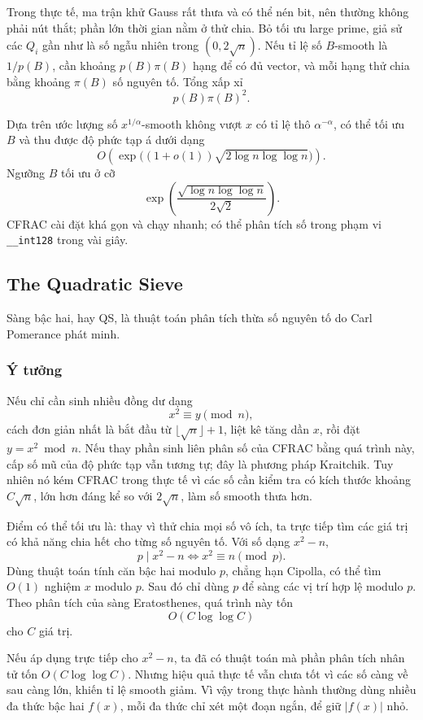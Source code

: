 \documentclass[11pt]{article}
\begin{document}
Trong thực tế, ma trận khử Gauss rất thưa và có thể nén bit, nên thường không
phải nút thắt; phần lớn thời gian nằm ở thử chia. Bỏ tối ưu large prime, giả
sử các \(Q_i\) gần như là số ngẫu nhiên trong \((0,2\sqrt n)\). Nếu tỉ lệ số
\(B\)-smooth là \(1/p(B)\), cần khoảng \(p(B)\pi(B)\) hạng để có đủ vector, và
mỗi hạng thử chia bằng khoảng \(\pi(B)\) số nguyên tố. Tổng xấp xỉ
\[
  p(B)\pi(B)^2.
\]

Dựa trên ước lượng số \(x^{1/\alpha}\)-smooth không vượt \(x\) có tỉ lệ thô
\(\alpha^{-\alpha}\), có thể tối ưu \(B\) và thu được độ phức tạp á dưới dạng
\[
  O\left(\exp\bigl((1+o(1))\sqrt{2\log n\log\log n}\bigr)\right).
\]
Ngưỡng \(B\) tối ưu ở cỡ
\[
  \exp\left(\frac{\sqrt{\log n\log\log n}}{2\sqrt2}\right).
\]
CFRAC cài đặt khá gọn và chạy nhanh; có thể phân tích số trong phạm vi
\texttt{\_\_int128} trong vài giây.

\subsection{The Quadratic Sieve}

Sàng bậc hai, hay QS, là thuật toán phân tích thừa số nguyên tố do Carl
Pomerance phát minh.

\subsubsection{Ý tưởng}

Nếu chỉ cần sinh nhiều đồng dư dạng
\[
  x^2\equiv y\pmod n,
\]
cách đơn giản nhất là bắt đầu từ \(\lfloor\sqrt n\rfloor+1\), liệt kê tăng
dần \(x\), rồi đặt \(y=x^2\bmod n\). Nếu thay phần sinh liên phân số của CFRAC
bằng quá trình này, cấp số mũ của độ phức tạp vẫn tương tự; đây là phương pháp
Kraitchik. Tuy nhiên nó kém CFRAC trong thực tế vì các số cần kiểm tra có kích
thước khoảng \(C\sqrt n\), lớn hơn đáng kể so với \(2\sqrt n\), làm số
smooth thưa hơn.

Điểm có thể tối ưu là: thay vì thử chia mọi số vô ích, ta trực tiếp tìm các
giá trị có khả năng chia hết cho từng số nguyên tố. Với số dạng \(x^2-n\),
\[
  p\mid x^2-n \Longleftrightarrow x^2\equiv n\pmod p.
\]
Dùng thuật toán tính căn bậc hai modulo \(p\), chẳng hạn Cipolla, có thể tìm
\(O(1)\) nghiệm \(x\) modulo \(p\). Sau đó chỉ dùng \(p\) để sàng các vị trí
hợp lệ modulo \(p\). Theo phân tích của sàng Eratosthenes, quá trình này tốn
\[
  O(C\log\log C)
\]
cho \(C\) giá trị.

Nếu áp dụng trực tiếp cho \(x^2-n\), ta đã có thuật toán mà phần phân tích
nhân tử tốn \(O(C\log\log C)\). Nhưng hiệu quả thực tế vẫn chưa tốt vì các số
càng về sau càng lớn, khiến tỉ lệ smooth giảm. Vì vậy trong thực hành thường
dùng nhiều đa thức bậc hai \(f(x)\), mỗi đa thức chỉ xét một đoạn ngắn, để giữ
\(|f(x)|\) nhỏ.
\end{document}
